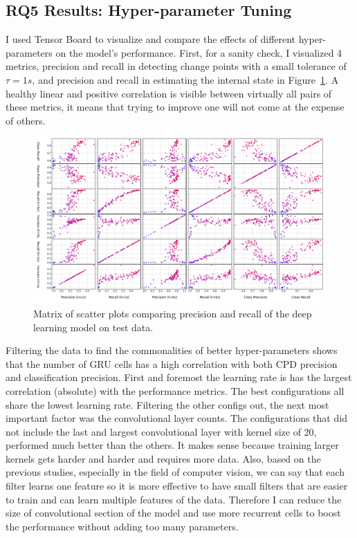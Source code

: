 \subsection{RQ5 Results: Hyper-parameter Tuning}
I used Tensor Board to visualize and compare the effects of different hyper-parameters on the model's performance. First, for a sanity check, I visualized 4 metrics, precision and recall in detecting change points with a small tolerance of $\tau=1s$, and precision and recall in estimating the internal state in Figure~\ref{fig:precision_recall_matrix}. A healthy linear and positive correlation is visible between virtually all pairs of these metrics, it means that trying to improve one will not come at the expense of others. 
\begin{figure}
    \centering
    \includegraphics[width=\columnwidth]{RQ3-5_charts/prec_recall_matrix_tuning_white_background.png}
    \caption{Matrix of scatter plots comparing precision and recall of the deep learning model on test data.}
    \label{fig:precision_recall_matrix}
\end{figure}

Filtering the data to find the commonalities of better hyper-parameters shows that the number of GRU cells has a high correlation with both CPD precision and classification precision. 
First and foremost the learning rate is has the largest correlation (absolute) with the performance metrics. The best configurations all share the lowest learning rate.
Filtering the other configs out, the next most important factor was the convolutional layer counts. 
The configurations that did not include the last and largest convolutional layer with kernel size of 20, performed much better than the others. 
It makes sense because training larger kernels gets harder and harder and requires more data. 
Also, based on the previous studies, especially in the field of computer vision, we can say that each filter learns one feature so it is more effective to have small filters that are easier to train and can learn multiple features of the data.
Therefore I can reduce the size of convolutional section of the model and use more recurrent cells to boost the performance without adding too many parameters. 

